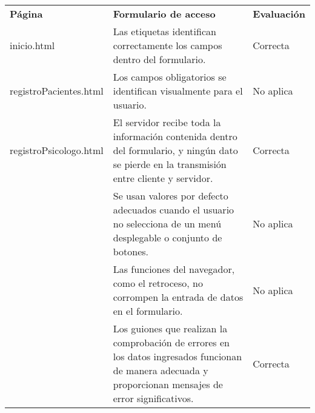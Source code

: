 \begin{table}[htpb]
\centering
\begin{tabularx}{\textwidth}{|l|X|l|}
\hline
\rowcolor[gray]{0.9}\multicolumn{3}{|l|}{\textbf{Anexo PI-006}}                                                                                                                                                                                                                        \\ \hline
\textbf{Página}                                                                 & \textbf{Formulario de acceso}                                                                                                                             & \textbf{Evaluación} \\ \hline
inicio.html & Las etiquetas identifican correctamente los campos dentro del formulario.                                                                                 & Correcta            \\ \cline{2-3} 
registroPacientes.html                                                                                & Los campos obligatorios se identifican visualmente para el usuario.                                                                                       & No aplica           \\ \cline{2-3} 
 registroPsicologo.html                                                                               & El servidor recibe toda la información contenida dentro del formulario, y ningún dato se pierde en la transmisión entre cliente y servidor.               & Correcta            \\ \cline{2-3} 
                                                                                & Se usan valores por defecto adecuados cuando el usuario no selecciona de un menú desplegable o conjunto de botones.                                       & No aplica           \\ \cline{2-3} 
                                                                                & Las funciones del navegador, como el retroceso, no corrompen la entrada de datos en el formulario.                                                        & No aplica           \\ \cline{2-3} 
                                                                                & Los guiones que realizan la comprobación de errores en los datos ingresados funcionan de manera adecuada y proporcionan mensajes de error significativos. & Correcta            \\ \cline{2-3} 

\end{tabularx}
\end{table}
